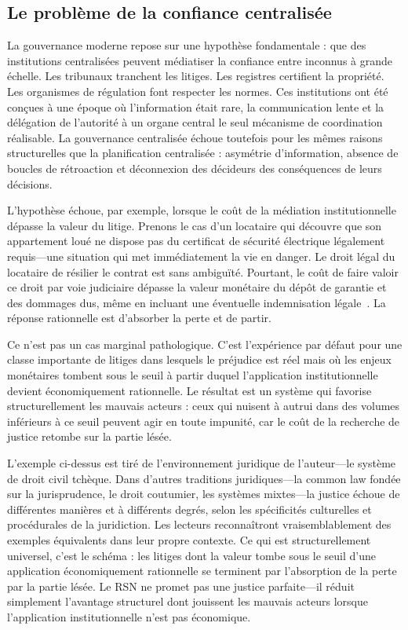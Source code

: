 \documentclass[11pt,a4paper,twocolumn]{article}
\begin{document}
\subsection{Le problème de la confiance centralisée}

La gouvernance moderne repose sur une hypothèse fondamentale : que des institutions centralisées peuvent médiatiser la confiance entre inconnus à grande échelle. Les tribunaux tranchent les litiges. Les registres certifient la propriété. Les organismes de régulation font respecter les normes. Ces institutions ont été conçues à une époque où l'information était rare, la communication lente et la délégation de l'autorité à un organe central le seul mécanisme de coordination réalisable. La gouvernance centralisée échoue toutefois pour les mêmes raisons structurelles que la planification centralisée : asymétrie d'information, absence de boucles de rétroaction et déconnexion des décideurs des conséquences de leurs décisions.

L'hypothèse échoue, par exemple, lorsque le coût de la médiation institutionnelle dépasse la valeur du litige. Prenons le cas d'un locataire qui découvre que son appartement loué ne dispose pas du certificat de sécurité électrique légalement requis---une situation qui met immédiatement la vie en danger. Le droit légal du locataire de résilier le contrat est sans ambiguïté. Pourtant, le coût de faire valoir ce droit par voie judiciaire dépasse la valeur monétaire du dépôt de garantie et des dommages dus, même en incluant une éventuelle indemnisation légale~\cite{czcourtfees}. La réponse rationnelle est d'absorber la perte et de partir.

Ce n'est pas un cas marginal pathologique. C'est l'expérience par défaut pour une classe importante de litiges dans lesquels le préjudice est réel mais où les enjeux monétaires tombent sous le seuil à partir duquel l'application institutionnelle devient économiquement rationnelle. Le résultat est un système qui favorise structurellement les mauvais acteurs : ceux qui nuisent à autrui dans des volumes inférieurs à ce seuil peuvent agir en toute impunité, car le coût de la recherche de justice retombe sur la partie lésée.

L'exemple ci-dessus est tiré de l'environnement juridique de l'auteur---le système de droit civil tchèque. Dans d'autres traditions juridiques---la common law fondée sur la jurisprudence, le droit coutumier, les systèmes mixtes---la justice échoue de différentes manières et à différents degrés, selon les spécificités culturelles et procédurales de la juridiction. Les lecteurs reconnaîtront vraisemblablement des exemples équivalents dans leur propre contexte. Ce qui est structurellement universel, c'est le schéma : les litiges dont la valeur tombe sous le seuil d'une application économiquement rationnelle se terminent par l'absorption de la perte par la partie lésée. Le RSN ne promet pas une justice parfaite---il réduit simplement l'avantage structurel dont jouissent les mauvais acteurs lorsque l'application institutionnelle n'est pas économique.
\end{document}
